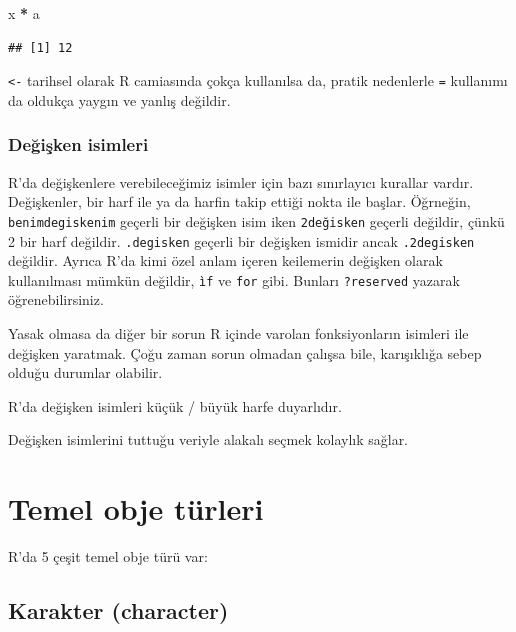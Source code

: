 \documentclass[]{book}
\newenvironment{Shaded}{\begin{snugshade}}{\end{snugshade}}
\newcommand{\NormalTok}[1]{#1}
\newcommand{\OperatorTok}[1]{\textcolor[rgb]{0.81,0.36,0.00}{\textbf{#1}}}
\newcommand{\StringTok}[1]{\textcolor[rgb]{0.31,0.60,0.02}{#1}}
\begin{document}
\begin{Shaded}
\begin{Highlighting}[]
\NormalTok{x }\OperatorTok{*}\StringTok{ }\NormalTok{a}
\end{Highlighting}
\end{Shaded}

\begin{verbatim}
## [1] 12
\end{verbatim}

\texttt{\textless{}-} tarihsel olarak R camiasında çokça kullanılsa da,
pratik nedenlerle \texttt{=} kullanımı da oldukça yaygın ve yanlış
değildir.

\hypertarget{degisken-isimleri}{%
\subsection{Değişken isimleri}\label{degisken-isimleri}}

R'da değişkenlere verebileceğimiz isimler için bazı sınırlayıcı kurallar
vardır. Değişkenler, bir harf ile ya da harfin takip ettiği nokta ile
başlar. Öğrneğin, \texttt{benimdegiskenim} geçerli bir değişken isim
iken \texttt{2değisken} geçerli değildir, çünkü 2 bir harf değildir.
\texttt{.degisken} geçerli bir değişken ismidir ancak
\texttt{.2degisken} değildir. Ayrıca R'da kimi özel anlam içeren
keilemerin değişken olarak kullanılması mümkün değildir, \texttt{ìf} ve
\texttt{for} gibi. Bunları \texttt{?reserved} yazarak öğrenebilirsiniz.

Yasak olmasa da diğer bir sorun R içinde varolan fonksiyonların isimleri
ile değişken yaratmak. Çoğu zaman sorun olmadan çalışsa bile,
karışıklığa sebep olduğu durumlar olabilir.

R'da değişken isimleri küçük / büyük harfe duyarlıdır.

Değişken isimlerini tuttuğu veriyle alakalı seçmek kolaylık sağlar.

\hypertarget{temel-obje-turleri}{%
\chapter{Temel obje türleri}\label{temel-obje-turleri}}

R'da 5 çeşit temel obje türü var:

\hypertarget{karakter-character}{%
\section{Karakter (character)}\label{karakter-character}}
\end{document}
